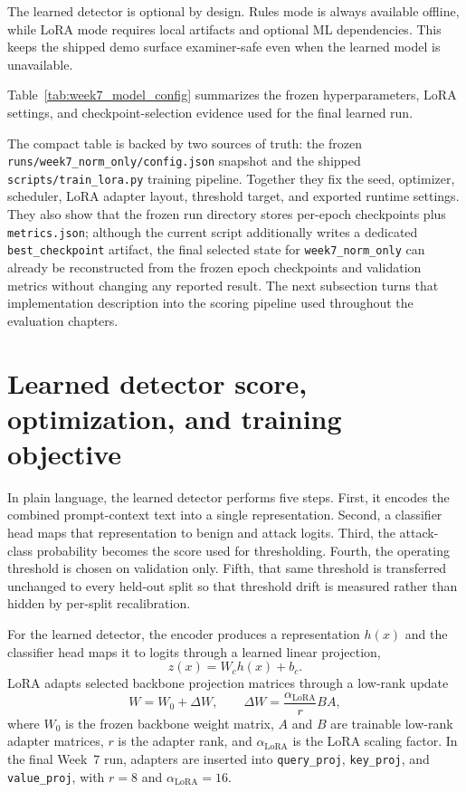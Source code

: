 The learned detector is optional by design. Rules mode is always available offline, while LoRA mode requires local artifacts and optional ML dependencies. This keeps the shipped demo surface examiner-safe even when the learned model is unavailable.

Table~\ref{tab:week7_model_config} summarizes the frozen hyperparameters, LoRA settings, and checkpoint-selection evidence used for the final learned run.



The compact table is backed by two sources of truth: the frozen \texttt{runs/week7\_norm\_only/config.json} snapshot and the shipped \texttt{scripts/train\_lora.py} training pipeline. Together they fix the seed, optimizer, scheduler, LoRA adapter layout, threshold target, and exported runtime settings. They also show that the frozen run directory stores per-epoch checkpoints plus \texttt{metrics.json}; although the current script additionally writes a dedicated \texttt{best\_checkpoint} artifact, the final selected state for \texttt{week7\_norm\_only} can already be reconstructed from the frozen epoch checkpoints and validation metrics without changing any reported result. The next subsection turns that implementation description into the scoring pipeline used throughout the evaluation chapters.

\section{Learned detector score, optimization, and training objective}

In plain language, the learned detector performs five steps. First, it encodes the combined prompt-context text into a single representation. Second, a classifier head maps that representation to benign and attack logits. Third, the attack-class probability becomes the score used for thresholding. Fourth, the operating threshold is chosen on validation only. Fifth, that same threshold is transferred unchanged to every held-out split so that threshold drift is measured rather than hidden by per-split recalibration.

For the learned detector, the encoder produces a representation $h(x)$ and the classifier head maps it to logits through a learned linear projection,
\begin{equation}
  z(x) = W_c h(x) + b_c.
\end{equation}
LoRA adapts selected backbone projection matrices through a low-rank update
\begin{equation}
  W = W_0 + \Delta W, \qquad \Delta W = \frac{\alpha_{\mathrm{LoRA}}}{r} B A,
\end{equation}
where $W_0$ is the frozen backbone weight matrix, $A$ and $B$ are trainable low-rank adapter matrices, $r$ is the adapter rank, and $\alpha_{\mathrm{LoRA}}$ is the LoRA scaling factor. In the final Week~7 run, adapters are inserted into \texttt{query\_proj}, \texttt{key\_proj}, and \texttt{value\_proj}, with $r=8$ and $\alpha_{\mathrm{LoRA}}=16$.

